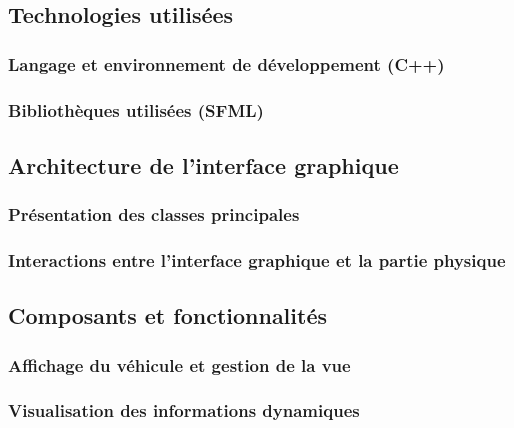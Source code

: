 \subsection{Technologies utilisées}\label{subsec:technologies-utilisees}
\subsubsection{Langage et environnement de développement (C++)}\label{subsubsec:c++}
\subsubsection{Bibliothèques utilisées (SFML)}\label{subsubsec:sfml}

\subsection{Architecture de l'interface graphique}\label{subsec:architecture-de-l-interface-graphique}
\subsubsection{Présentation des classes principales}\label{subsubsec:presentation-des-classes-principales}
\subsubsection{Interactions entre l'interface graphique et la partie physique}\label{subsubsec:interactions-entre-l'interface-graphique-et-la-partie-physique}

\subsection{Composants et fonctionnalités}\label{subsec:composants-et-fonctionnalites}
\subsubsection{Affichage du véhicule et gestion de la vue}\label{subsubsec:affichage-du-vehicule-et-gestion-de-la-vue}
\label{subsubsubsec:rendu-du-sprite-du-vehicule}
\label{subsubsubsec:suivi-du-vehicule}
\subsubsection{Visualisation des informations dynamiques}\label{subsubsec:visualisation-des-informations-dynamiques}
\label{subsubsubsec:mode-de-debug}
